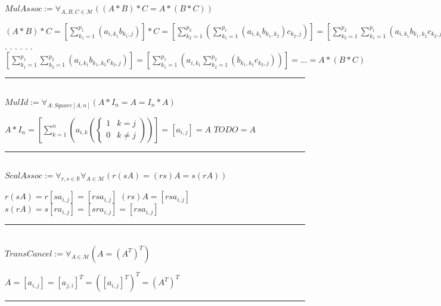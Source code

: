 \documentclass{book}
\newcommand{\abr}{:=}
\newcommand{\cont}{\phantom{.}. . .\phantom{.}}
\begin{document}
$MulAssoc \abr \forall_{A, B, C \in \mathcal{M}}((A * B) * C = A * (B * C))$
\begin{enumerate}
  \lit $(A * B) * C = \left[\sum_{k_1 = 1}^{p_1}(a_{i, k_1} b_{k_1, j})\right] * C = \left[\sum_{k_2 = 1}^{p_2}(\sum_{k_1 = 1}^{p_1}(a_{i, k_1} b_{k_1, k_2}) c_{k_2, j})\right] = \left[\sum_{k_2 = 1}^{p_2} \sum_{k_1 = 1}^{p_1}(a_{i, k_1} b_{k_1, k_2} c_{k_2, j})\right] = $ \cont
  \lit \cont $\left[\sum_{k_1 = 1}^{p_1} \sum_{k_2 = 1}^{p_2}(a_{i, k_1} b_{k_1, k_2} c_{k_2, j})\right] = \left[\sum_{k_1 = 1}^{p_1}(a_{i, k_1} \sum_{k_2 = 1}^{p_2}(b_{k_1, k_2} c_{k_2, j}))\right] = \ldots = A * (B * C)$
\end{enumerate} \vspace{.75mm} \hrule \vspace{.75mm} \ \\ 

$MulId \abr \forall_{A : Square[A, n]}(A * I_n = A = I_n * A)$
\begin{enumerate}
  \lit $A * I_n = \left[\sum_{k = 1}^{n}\left(a_{i, k} 
    \left(\begin{cases} 
      1 & k = j \\
      0 & k \neq j 
    \end{cases}\right)
  \right)\right] = [a_{i, j}] = A$
  \lit $TODO = A$
\end{enumerate} \vspace{.75mm} \hrule \vspace{.75mm} \ \\ 

$ScalAssoc \abr \forall_{r, s \in \mathbb{R}} \forall_{A \in \mathcal{M}}(r (s A) = (r s) A = s (r A))$
\begin{enumerate}
  \lit $r (s A) = r [s a_{i, j}] = [r s a_{i, j}]$
  \lit $(r s) A = [r s a_{i, j}]$
  \lit $s (r A) = s [r a_{i, j}] = [s r a_{i, j}] = [r s a_{i, j}]$
\end{enumerate} \vspace{.75mm} \hrule \vspace{.75mm} \ \\ 

$TransCancel \abr \forall_{A \in \mathcal{M}}(A = (A^T)^T)$
\begin{enumerate}
  \lit $A = [a_{i, j}] = [a_{j, i}]^T = ([a_{i, j}]^T)^T = (A^T)^T$
\end{enumerate} \vspace{.75mm} \hrule \vspace{.75mm} \ \\ 
\end{document}
